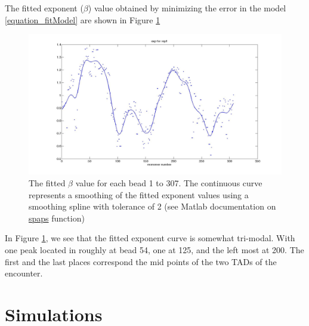 \documentclass[12pt]{book}
\begin{document}
The fitted exponent ($\beta$) value obtained by minimizing the error in the model \ref{equation_fitModel} are shown in Figure \ref{figure_fittedExpExperimentalData307Beads}
\begin{figure}[H]
\includegraphics[scale=0.15]{fittedExpValuesWithSplineRep1}
\caption{\scriptsize{The fitted $\beta$ value for each bead 1 to 307. The continuous curve represents a smoothing of the fitted exponent values using a smoothing spline with tolerance of 2 (see Matlab documentation on \href{http://www.mathworks.fr/fr/help/curvefit/spaps.html}{spaps} function)}}
\label{figure_fittedExpExperimentalData307Beads}
\end{figure}

In Figure \ref{figure_fittedExpExperimentalData307Beads}, we see that the fitted exponent curve is somewhat tri-modal. With one peak located in roughly at bead 54, one at 125, and the left most at 200. The first and the last places correspond the mid points of the two TADs of the encounter. 



\chapter{Simulations}
\end{document}
